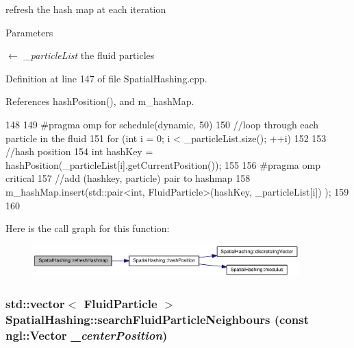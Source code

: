 refresh the hash map at each iteration 


\begin{DoxyParams}{Parameters}
\item[\mbox{$\leftarrow$} {\em \_\-particleList}]the fluid particles \end{DoxyParams}


Definition at line 147 of file SpatialHashing.cpp.



References hashPosition(), and m\_\-hashMap.




\begin{DoxyCode}
148 {
149 #pragma omp for schedule(dynamic, 50)
150     //loop through each particle in the fluid
151     for (int i = 0; i < _particleList.size(); ++i)
152     {
153         //hash position
154         int hashKey = hashPosition(_particleList[i].getCurrentPosition());
155 
156 #pragma omp critical
157         //add (hashkey, particle) pair to hashmap
158         m_hashMap.insert(std::pair<int, FluidParticle>(hashKey, _particleList[i])
      );
159     }
160 }
\end{DoxyCode}




Here is the call graph for this function:\nopagebreak
\begin{figure}[H]
\begin{center}
\leavevmode
\includegraphics[width=292pt]{class_spatial_hashing_acd1b87ec8ea289a18d431b7a3fde50c0_cgraph}
\end{center}
\end{figure}


\hypertarget{class_spatial_hashing_af5c8f67520bfd03e32800e87af56ffba}{
\subsubsection[{searchFluidParticleNeighbours}]{\setlength{\rightskip}{0pt plus 5cm}std::vector$<$ {\bf FluidParticle} $>$ SpatialHashing::searchFluidParticleNeighbours (const ngl::Vector {\em \_\-centerPosition})}}
\label{class_spatial_hashing_af5c8f67520bfd03e32800e87af56ffba}


